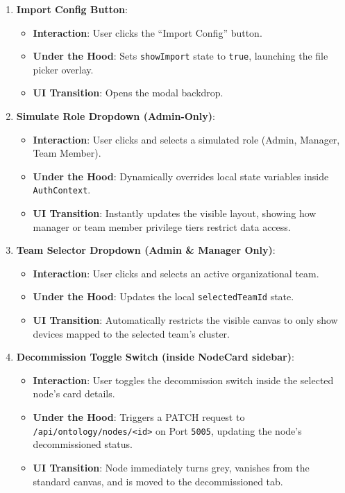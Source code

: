 \documentclass[11pt,a4paper]{article}
\begin{document}
\begin{enumerate}
    \item \textbf{Import Config Button}:
    \begin{itemize}
        \item \textbf{Interaction}: User clicks the ``Import Config'' button.
        \item \textbf{Under the Hood}: Sets \texttt{showImport} state to \texttt{true}, launching the file picker overlay.
        \item \textbf{UI Transition}: Opens the modal backdrop.
    \end{itemize}
    
    \item \textbf{Simulate Role Dropdown (Admin-Only)}:
    \begin{itemize}
        \item \textbf{Interaction}: User clicks and selects a simulated role (Admin, Manager, Team Member).
        \item \textbf{Under the Hood}: Dynamically overrides local state variables inside \texttt{AuthContext}.
        \item \textbf{UI Transition}: Instantly updates the visible layout, showing how manager or team member privilege tiers restrict data access.
    \end{itemize}
    
    \item \textbf{Team Selector Dropdown (Admin \& Manager Only)}:
    \begin{itemize}
        \item \textbf{Interaction}: User clicks and selects an active organizational team.
        \item \textbf{Under the Hood}: Updates the local \texttt{selectedTeamId} state.
        \item \textbf{UI Transition}: Automatically restricts the visible canvas to only show devices mapped to the selected team's cluster.
    \end{itemize}
    
    \item \textbf{Decommission Toggle Switch (inside NodeCard sidebar)}:
    \begin{itemize}
        \item \textbf{Interaction}: User toggles the decommission switch inside the selected node's card details.
        \item \textbf{Under the Hood}: Triggers a PATCH request to \texttt{/api/ontology/nodes/<id>} on Port \texttt{5005}, updating the node's decommissioned status.
        \item \textbf{UI Transition}: Node immediately turns grey, vanishes from the standard canvas, and is moved to the decommissioned tab.
    \end{itemize}
    

\end{enumerate}
\end{document}
